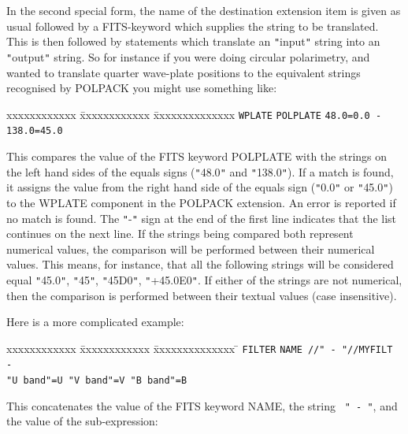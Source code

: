 \documentclass[twoside,11pt]{article}
\renewcommand{\_}{\texttt{\symbol{95}}}
\begin{document}
{{      In the second special form, the name of the destination extension item
      is given as usual followed by a FITS-keyword which supplies the string
      to be translated. This is then followed by statements which translate
      an {\tt "}input{\tt "} string into an {\tt "}output{\tt "} string. So for instance if you
      were doing circular polarimetry, and wanted to translate quarter
      wave-plate positions to the equivalent strings recognised by POLPACK
      you might use something like:

\begin{tabbing}
 xxxxxxxxxxxx \= xxxxxxxxxxxx            \= xxxxxxxxxxxxxx \kill
              \>  \texttt{WPLATE}        \> \texttt{POLPLATE} \=  \texttt{48.0=0.0 -} \\
              \>                         \>                   \>  \texttt{138.0=45.0} 
\end{tabbing}

      This compares the value of the FITS keyword POLPLATE with the strings 
      on the left hand sides of the equals signs ({\tt "}48.0{\tt "} and 
      {\tt "}138.0{\tt "}). If a match is found, it assigns the value from 
      the right hand side of the equals sign ({\tt "}0.0{\tt "} or 
      {\tt "}45.0{\tt "}) to the WPLATE component in the POLPACK extension. 
      An error is reported if no match is found. The {\tt "}-{\tt "}
      sign at the end of the first line indicates that the list continues
      on the next line. If the strings being compared both represent 
      numerical values, the comparison will be performed between their
      numerical values. This means, for instance, that all the following 
      strings will be considered equal {\tt "}45.0{\tt "}, {\tt "}45{\tt "}, 
      {\tt "}45D0{\tt "}, {\tt "}+45.0E0{\tt "}. If either of the strings
      are not numerical, then the comparison is performed between their
      textual values (case insensitive).

      Here is a more complicated example:
 
\begin{tabbing}
 xxxxxxxxxxxx \= xxxxxxxxxxxx            \= xxxxxxxxxxxxxx \= \kill
              \>  \texttt{FILTER}        \> \texttt{NAME //" - "//MYFILT -} \\
              \>                         \> \= \texttt{"U band"=U "V band"=V "B band"=B}
\end{tabbing}
 
      This concatenates the value of the FITS keyword NAME, the string
      \texttt{ " -  "}, and the value of the sub-expression:
 
}}
\end{document}
